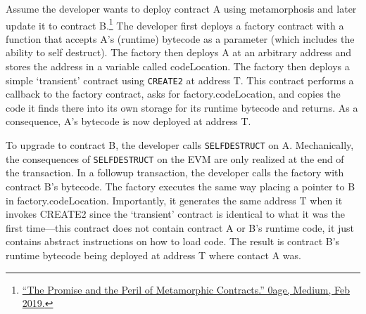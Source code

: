 

Assume the developer wants to deploy contract A using metamorphosis and later update it to contract B.\footnote{\href{https://medium.com/@0age/the-promise-and-the-peril-of-metamorphic-contracts-9eb8b8413c5e}{``The Promise and the Peril of Metamorphic Contracts.'' 0age, Medium, Feb 2019.}} The developer first deploys a factory contract with a function that accepts A's (runtime) bytecode as a parameter (which includes the ability to self destruct). The factory then deploys A at an arbitrary address and stores the address in a variable called codeLocation. The factory then deploys a simple `transient' contract using \texttt{CREATE2} at address T. This contract performs a callback to the factory contract, asks for factory.codeLocation, and copies the code it finds there into its own storage for its runtime bytecode and returns. As a consequence, A's bytecode is now deployed at address T. 

To upgrade to contract B, the developer calls \texttt{SELFDESTRUCT} on A. Mechanically, the consequences of \texttt{SELFDESTRUCT} on the EVM are only realized at the end of the transaction. In a followup transaction, the developer calls the factory with contract B's bytecode. The factory executes the same way placing a pointer to B in factory.codeLocation. Importantly, it generates the same address T when it invokes CREATE2 since the `transient' contract is identical to what it was the first time---this contract does not contain contract A or B's runtime code, it just contains abstract instructions on how to load code. The result is contract B's runtime bytecode being deployed at address T where contact A was. 
 

